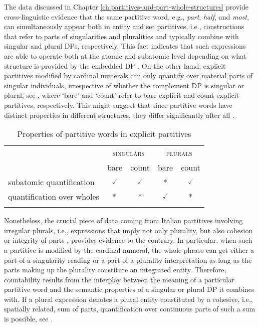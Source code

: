 The data discussed in Chapter \ref{ch:partitives-and-part-whole-structures} provide cross-linguistic evidence that the same partitive word, e.g., \textit{part}, \textit{half}, and \textit{most}, can simultaneously appear both in entity and set partitives, i.e., constructions that refer to parts of singularities and pluralities and typically combine with singular and plural DPs, respectively. This fact indicates that such expressions are able to operate both at the atomic and subatomic level depending on what structure is provided by the embedded DP \citep[see][]{moltmann1997parts,moltmann1998part}. On the other hand, explicit partitives modified by cardinal numerals can only quantify over material parts of singular individuals, irrespective of whether the complement DP is singular or plural, see  , where `bare' and `count' refer to bare explicit and count explicit partitives, respectively. This might suggest that since partitive words have distinct properties in different structures, they differ significantly after all \citep{schwarzschild1996pluralities}.

    \begin{table}[h!]
    \centering
\begin{tabular}{lcccc}
\lsptoprule
                           & \multicolumn{2}{c}{\textsc{singulars}}          & \multicolumn{2}{c}{\textsc{plurals}} \\
                           & bare & count & bare & count \\ \midrule
subatomic quantification   & $\checked$                   & $\checked$                    & *                              & $\checked$ \\
quantification over wholes & *                              & *                               & $\checked$                   & * \\ \lspbottomrule
\end{tabular}
\caption{Properties of partitive words in explicit partitives}
\label{tab:properties-of-partitive-words2}
\end{table}

Nonetheless, the crucial piece of data coming from Italian partitives involving irregular plurals, i.e., expressions that imply not only plurality, but also cohesion or integrity of parts \citep{ojeda1995semantics,acquaviva2008lexical}, provides evidence to the contrary. In particular, when such a partitive is modified by the cardinal numeral, the whole phrase can get either a part-of-a-singularity reading or a part-of-a-plurality interpretation as long as the parts making up the plurality constitute an integrated entity. Therefore, countability results from the interplay between the meaning of a particular partitive word and the semantic properties of a singular or plural DP it combines with. If a plural expression denotes a plural entity constituted by a cohesive, i.e., spatially related, sum of parts, quantification over continuous parts of such a sum is possible, see .
	
